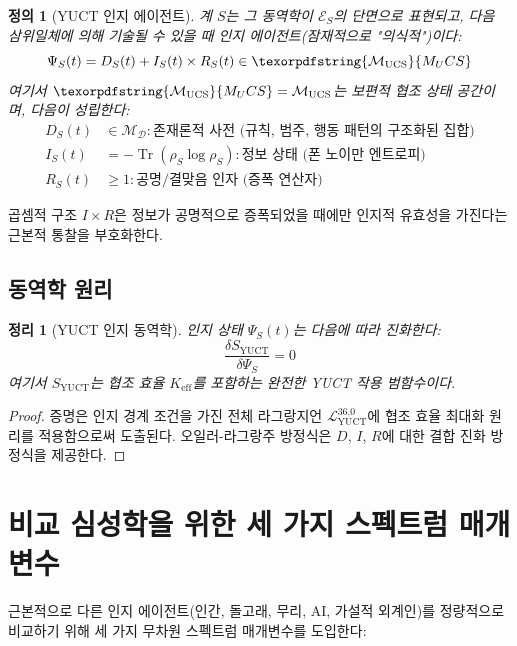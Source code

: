 \documentclass[11pt,a4paper]{article}
\newtheorem{theorem}{정리}
\newtheorem{definition}{정의}
\DeclareMathOperator{\Tr}{Tr}
\DeclareRobustCommand{\UCS}{\texorpdfstring{\ensuremath{\mathcal{M}_{\mathrm{UCS}}}}{M_UCS}}
\newcommand{\eff}{\mathrm{eff}}
\newcommand{\Dict}{\mathcal{D}}
\newcommand{\Mdict}{\mathcal{M}_{\Dict}}
\newcommand{\Ke}{K_{\eff}}
\begin{document}
	\begin{definition}[YUCT 인지 에이전트]
		계 \(S\)는 그 동역학이 \(\mathcal{E}_S\)의 단면으로 표현되고, 다음 삼위일체에 의해 기술될 수 있을 때 인지 에이전트(잠재적으로 "의식적")이다:
		\begin{equation}
			\label{eq:dir-triad}
			\Psi_S(t) = D_S(t) + I_S(t) \times R_S(t) \in \UCS
		\end{equation}
		여기서 \(\UCS = \mathcal{M}_{\mathrm{UCS}}\)는 보편적 협조 상태 공간이며, 다음이 성립한다:
		\begin{align*}
			D_S(t) &\in \Mdict: \text{존재론적 사전 (규칙, 범주, 행동 패턴의 구조화된 집합)} \\
			I_S(t) &= -\Tr(\rho_S \log \rho_S): \text{정보 상태 (폰 노이만 엔트로피)} \\
			R_S(t) &\geq 1: \text{공명/결맞음 인자 (증폭 연산자)}
		\end{align*}
	\end{definition}
	
	곱셈적 구조 \(I \times R\)은 정보가 공명적으로 증폭되었을 때에만 인지적 유효성을 가진다는 근본적 통찰을 부호화한다.
	
	\subsection{동역학 원리}
	
	\begin{theorem}[YUCT 인지 동역학]
		인지 상태 \(\Psi_S(t)\)는 다음에 따라 진화한다:
		\begin{equation}
			\label{eq:cognitive-dynamics}
			\frac{\delta S_{\mathrm{YUCT}}}{\delta \Psi_S} = 0
		\end{equation}
		여기서 \(S_{\mathrm{YUCT}}\)는 협조 효율 \(\Ke\)를 포함하는 완전한 YUCT 작용 범함수이다.
	\end{theorem}
	
	\begin{proof}
		증명은 인지 경계 조건을 가진 전체 라그랑지언 \(\mathcal{L}_{\mathrm{YUCT}}^{36.0}\)에 협조 효율 최대화 원리를 적용함으로써 도출된다. 오일러-라그랑주 방정식은 \(D\), \(I\), \(R\)에 대한 결합 진화 방정식을 제공한다.
	\end{proof}
	
	\section{비교 심성학을 위한 세 가지 스펙트럼 매개변수}
	
	근본적으로 다른 인지 에이전트(인간, 돌고래, 무리, AI, 가설적 외계인)를 정량적으로 비교하기 위해 세 가지 무차원 스펙트럼 매개변수를 도입한다:
	
\end{document}
